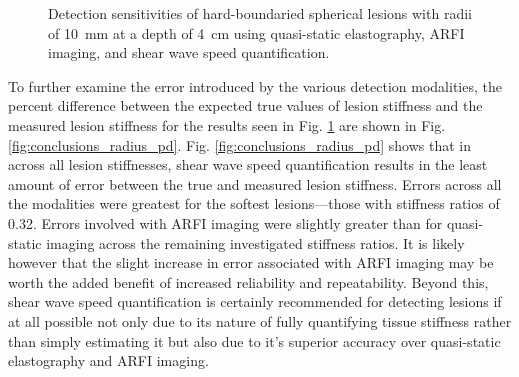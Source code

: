 			\begin{figure}[!htb]
				\centering
				\caption[Detection sensitivities of hard-boundaried spherical lesions using the three investigated imaging modalities]{Detection sensitivities of hard-boundaried spherical lesions with radii of \SI{10}{\mm} at a depth of \SI{4}{\cm} using quasi-static elastography, ARFI imaging, and shear wave speed quantification.}
				\label{fig:conclusion_radius}
			\end{figure}

			To further examine the error introduced by the various detection modalities, the percent difference between the expected true values of lesion stiffness and the measured lesion stiffness for the results seen in Fig. \ref{fig:conclusion_radius} are shown in Fig. \ref{fig:conclusions_radius_pd}. Fig. \ref{fig:conclusions_radius_pd} shows that in across all lesion stiffnesses, shear wave speed quantification results in the least amount of error between the true and measured lesion stiffness. Errors across all the modalities were greatest for the softest lesions---those with stiffness ratios of 0.32. Errors involved with ARFI imaging were slightly greater than for quasi-static imaging across the remaining investigated stiffness ratios. It is likely however that the slight increase in error associated with ARFI imaging may be worth the added benefit of increased reliability and repeatability. Beyond this, shear wave speed quantification is certainly recommended for detecting lesions if at all possible not only due to its nature of fully quantifying tissue stiffness rather than simply estimating it but also due to it's superior accuracy over quasi-static elastography and ARFI imaging.

